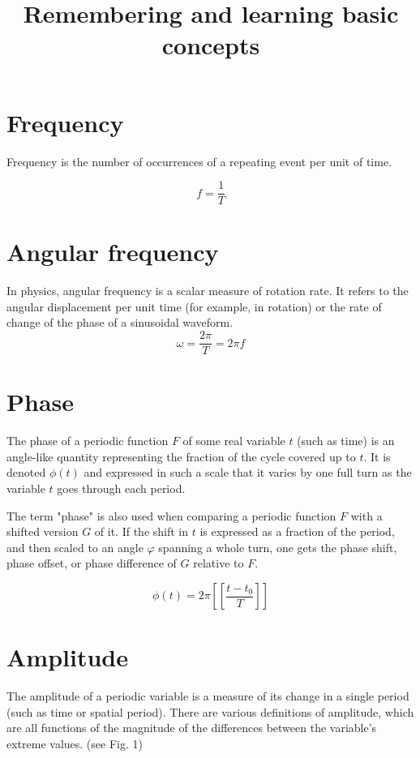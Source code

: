 \documentclass[journal,compsoc]{IEEEtran}
\begin{document}
\title{Remembering and learning basic concepts \\
}

\maketitle

\section{Frequency}

Frequency is the number of occurrences of a repeating event per unit of time.

\[ f = \frac{1}{T} \] 

\section{Angular frequency}
In physics, angular frequency is a scalar measure of rotation rate. It refers to the angular displacement per unit time (for example, in rotation) or the rate of change of the phase of a sinusoidal waveform.
\[\omega = \frac{2\pi}{T} = 2\pi f \]

\section{Phase}
The phase of a periodic function \(F\) of some real variable \(t\) (such as time) is an angle-like quantity representing the fraction of the cycle covered up to \(t\). It is denoted \(\phi(t)\) and expressed in such a scale that it varies by one full turn as the variable \(t\) goes through each period.

The term "phase" is also used when comparing a periodic function \(F\) with a shifted version \(G\) of it. If the shift in \(t\) is expressed as a fraction of the period, and then scaled to an angle \(\varphi\) spanning a whole turn, one gets the phase shift, phase offset, or phase difference of \(G\) relative to \(F\).

\[\phi (t)=2\pi \left[\!\!\left[{\frac {t-t_{0}}{T}}\right]\!\!\right]\]

\section{Amplitude}
The amplitude of a periodic variable is a measure of its change in a single period (such as time or spatial period). There are various definitions of amplitude, which are all functions of the magnitude of the differences between the variable's extreme values. (see Fig. 1)
\end{document}
